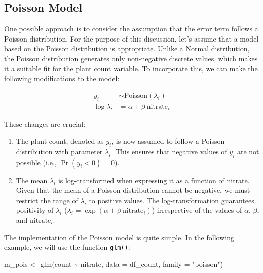 \documentclass[
]{book}
\newenvironment{Shaded}{\begin{snugshade}}{\end{snugshade}}
\newcommand{\AttributeTok}[1]{\textcolor[rgb]{0.77,0.63,0.00}{#1}}
\newcommand{\FunctionTok}[1]{\textcolor[rgb]{0.00,0.00,0.00}{#1}}
\newcommand{\NormalTok}[1]{#1}
\newcommand{\OtherTok}[1]{\textcolor[rgb]{0.56,0.35,0.01}{#1}}
\newcommand{\SpecialCharTok}[1]{\textcolor[rgb]{0.00,0.00,0.00}{#1}}
\newcommand{\StringTok}[1]{\textcolor[rgb]{0.31,0.60,0.02}{#1}}
\providecommand{\tightlist}{%
  \setlength{\itemsep}{0pt}\setlength{\parskip}{0pt}}
\begin{document}
\hypertarget{poisson-model}{%
\subsection{Poisson Model}\label{poisson-model}}

One possible approach is to consider the assumption that the error term follows a Poisson distribution. For the purpose of this discussion, let's assume that a model based on the Poisson distribution is appropriate. Unlike a Normal distribution, the Poisson distribution generates only non-negative discrete values, which makes it a suitable fit for the plant count variable. To incorporate this, we can make the following modifications to the model:

\[
\begin{aligned}
y_i &\sim \text{Poisson}(\lambda_i)\\
\log\lambda_i &= \alpha + \beta~\text{nitrate}_i
\end{aligned}
\]

These changes are crucial:

\begin{enumerate}
\def\labelenumi{\arabic{enumi}.}
\tightlist
\item
  The plant count, denoted as \(y_i\), is now assumed to follow a Poisson distribution with parameter \(\lambda_i\). This ensures that negative values of \(y_i\) are not possible (i.e., \(\Pr(y_i < 0) = 0\)).
\item
  The mean \(\lambda_i\) is log-transformed when expressing it as a function of nitrate. Given that the mean of a Poisson distribution cannot be negative, we must restrict the range of \(\lambda_i\) to positive values. The log-transformation guarantees positivity of \(\lambda_i\) (\(\lambda_i = \exp(\alpha + \beta~\text{nitrate}_i)\)) irrespective of the values of \(\alpha\), \(\beta\), and \(\text{nitrate}_i\).
\end{enumerate}

The implementation of the Poisson model is quite simple. In the following example, we will use the function \texttt{glm()}:

\begin{Shaded}
\begin{Highlighting}[]
\NormalTok{m\_pois }\OtherTok{\textless{}{-}} \FunctionTok{glm}\NormalTok{(count }\SpecialCharTok{\textasciitilde{}}\NormalTok{ nitrate,}
              \AttributeTok{data =}\NormalTok{ df\_count,}
              \AttributeTok{family =} \StringTok{"poisson"}\NormalTok{)}
\end{Highlighting}
\end{Shaded}
\end{document}
